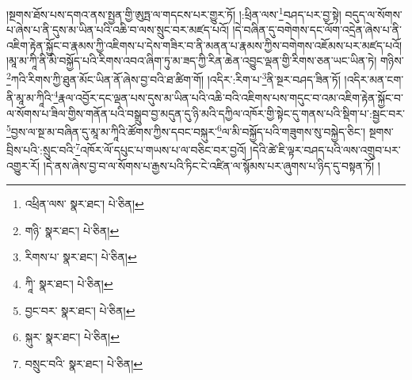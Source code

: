 །སྔགས་ཐོས་པས་དགའ་ནས་སྤྱན་གྱི་ཨུཏྤ་ལ་གདངས་པར་གྱུར་ཏོ། །:ཕྲིན་ལས་\footnote{འཕྲིན་ལས་  སྣར་ཐང་།  པེ་ཅིན། }བཤད་པར་བྱ་སྟེ། བདུད་ལ་སོགས་པ་ཞེས་པ་ནི་དུས་མ་ཡིན་པའི་འཆི་བ་ལས་སྲུང་བར་མཛད་པའོ། །དེ་བཞིན་དུ་བགེགས་དང་ལོག་འདྲེན་ཞེས་པ་ནི་འཇིག་རྟེན་སྐྱོང་བ་རྣམས་ཀྱི་འཇིགས་པ་དེས་གཟིར་བ་ནི་མནན་པ་རྣམས་ཀྱིས་བགེགས་འཇོམས་པར་མཛད་པའོ། །མཱ་མ་ཀཱི་ནི་མི་བསྐྱོད་པའི་རིགས་འབའ་ཞིག་ཏུ་མ་ཟད་ཀྱི་རིན་ཆེན་འབྱུང་ལྡན་གྱི་རིགས་ཅན་ཡང་ཡིན་ཏེ། གཉིས་\footnote{གཉི་  སྣར་ཐང་།  པེ་ཅིན། }ཀའི་རིགས་ཀྱི་ཐུན་མོང་ཡིན་ནོ་ཞེས་བྱ་བའི་ཐ་ཚིག་གོ། །འདིར་:རིག་པ་\footnote{རིགས་པ་  སྣར་ཐང་།  པེ་ཅིན། }ནི་སྔར་བཤད་ཟིན་ཏོ། །འདིར་མན་ངག་ནི་མཱ་མ་ཀཱིའི་\footnote{ཀཱི་  སྣར་ཐང་།  པེ་ཅིན། }རྣལ་འབྱོར་དང་ལྡན་པས་དུས་མ་ཡིན་པའི་འཆི་བའི་འཇིགས་པས་གདུང་བ་འམ་འཇིག་རྟེན་སྐྱོང་བ་ལ་སོགས་པ་ཟིལ་གྱིས་གནོན་པའི་བསྒྲུབ་བྱ་མདུན་དུ་ཉི་མའི་དཀྱིལ་འཁོར་གྱི་སྟེང་དུ་གནས་པའི་སྡིག་པ་:སྦྱང་བར་\footnote{བྱང་བར་  སྣར་ཐང་།  པེ་ཅིན། }བྱས་ལ་སྔ་མ་བཞིན་དུ་མཱ་མ་ཀཱིའི་ཚོགས་ཀྱིས་དབང་བསྐུར་\footnote{སྐུར་  སྣར་ཐང་།  པེ་ཅིན། }ལ་མི་བསྐྱོད་པའི་གཟུགས་སུ་བསྐྱེད་ཅིང་། སྔགས་བྲིས་པའི་:སྲུང་བའི་\footnote{བསྲུང་བའི་  སྣར་ཐང་།  པེ་ཅིན། }འཁོར་ལོ་དཔུང་པ་གཡས་པ་ལ་བཅིང་བར་བྱའོ། །དེའི་ཚེ་ཇི་ལྟར་བཤད་པའི་ལས་འགྲུབ་པར་འགྱུར་རོ། །དེ་ནས་ཞེས་བྱ་བ་ལ་སོགས་པ་རྒྱས་པའི་ཏིང་ངེ་འཛིན་ལ་སྙོམས་པར་ཞུགས་པ་ཉིད་དུ་བསྟན་ཏོ། །
